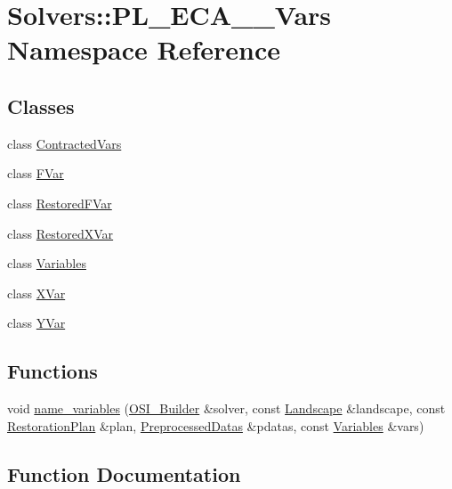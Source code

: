 \hypertarget{namespace_solvers_1_1_p_l___e_c_a__3___vars}{}\section{Solvers\+:\+:P\+L\+\_\+\+E\+C\+A\+\_\+\_\+\+Vars Namespace Reference}
\label{namespace_solvers_1_1_p_l___e_c_a__3___vars}
\subsection*{Classes}
\begin{DoxyCompactItemize}
\item 
class \hyperlink{class_solvers_1_1_p_l___e_c_a__3___vars_1_1_contracted_vars}{Contracted\+Vars}
\item 
class \hyperlink{class_solvers_1_1_p_l___e_c_a__3___vars_1_1_f_var}{F\+Var}
\item 
class \hyperlink{class_solvers_1_1_p_l___e_c_a__3___vars_1_1_restored_f_var}{Restored\+F\+Var}
\item 
class \hyperlink{class_solvers_1_1_p_l___e_c_a__3___vars_1_1_restored_x_var}{Restored\+X\+Var}
\item 
class \hyperlink{class_solvers_1_1_p_l___e_c_a__3___vars_1_1_variables}{Variables}
\item 
class \hyperlink{class_solvers_1_1_p_l___e_c_a__3___vars_1_1_x_var}{X\+Var}
\item 
class \hyperlink{class_solvers_1_1_p_l___e_c_a__3___vars_1_1_y_var}{Y\+Var}
\end{DoxyCompactItemize}
\subsection*{Functions}
\begin{DoxyCompactItemize}
\item 
void \hyperlink{namespace_solvers_1_1_p_l___e_c_a__3___vars_a0cb20b2049c8ec16fdc6180a8875d64f}{name\+\_\+variables} (\hyperlink{class_o_s_i___builder}{O\+S\+I\+\_\+\+Builder} \&solver, const \hyperlink{class_landscape}{Landscape} \&landscape, const \hyperlink{class_restoration_plan}{Restoration\+Plan} \&plan, \hyperlink{class_preprocessed_datas}{Preprocessed\+Datas} \&pdatas, const \hyperlink{class_solvers_1_1_p_l___e_c_a__3___vars_1_1_variables}{Variables} \&vars)
\end{DoxyCompactItemize}


\subsection{Function Documentation}
\mbox{\label{namespace_solvers_1_1_p_l___e_c_a__3___vars_a0cb20b2049c8ec16fdc6180a8875d64f}} 

